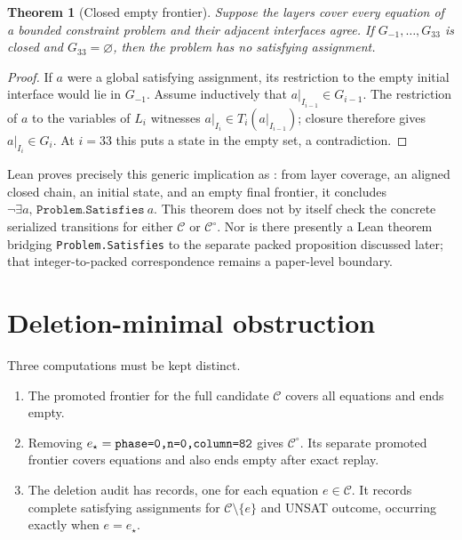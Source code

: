 \documentclass[11pt,twoside]{article}
\newtheorem{theorem}[definition]{Theorem}
\theoremstyle{remark}
\newcommand{\Candidate}{\ensuremath{\mathcal{C}}}
\newcommand{\Core}{\ensuremath{\mathcal{C}^{\circ}}}
\begin{document}
\begin{theorem}[Closed empty frontier]
\label{thm:closed-empty-frontier}
Suppose the layers cover every equation of a bounded constraint problem and
their adjacent interfaces agree.  If $G_{-1},\ldots,G_{33}$ is closed and
$G_{33}=\varnothing$, then the problem has no satisfying assignment.
\end{theorem}

\begin{proof}
If $a$ were a global satisfying assignment, its restriction to the empty
initial interface would lie in $G_{-1}$.  Assume inductively that
$a|_{I_{i-1}}\in G_{i-1}$.  The restriction of $a$ to the variables of
$L_i$ witnesses
$a|_{I_i}\in T_i(a|_{I_{i-1}})$; closure therefore gives
$a|_{I_i}\in G_i$.  At $i=33$ this puts a state in the empty set, a
contradiction.
\end{proof}

Lean proves precisely this generic implication as
\GenericSoundnessTheorem: from layer coverage, an aligned closed chain, an
initial state, and an empty final frontier, it concludes
$\neg\exists a,\,\texttt{Problem.Satisfies}\ a$.  This theorem does not by
itself check the concrete serialized transitions for either $\Candidate$ or
$\Core$.  Nor is there presently a Lean theorem bridging
\texttt{Problem.Satisfies} to the separate packed proposition discussed
later; that integer-to-packed correspondence remains a paper-level boundary.

\section{Deletion-minimal obstruction}
\label{sec:deletion-minimality}

Three computations must be kept distinct.
\begin{enumerate}[leftmargin=*,itemsep=3pt]
  \item The promoted frontier for the full candidate $\Candidate$ covers all
        \CandidateEquationCount{} equations and ends empty.
  \item Removing $e_\star=\texttt{phase=0,n=0,column=82}$ gives $\Core$.  Its separate
        promoted frontier covers \CoreEquationCount{} equations and also ends
        empty after exact replay.
  \item The deletion audit has \DeletionAuditCount{} records, one for each
        equation $e\in\Candidate$.  It records \SatDeletionCount{} complete
        satisfying assignments for $\Candidate\setminus\{e\}$ and
        \UnsatDeletionCount{} UNSAT outcome, occurring exactly when
        $e=e_\star$.
\end{enumerate}
\end{document}
